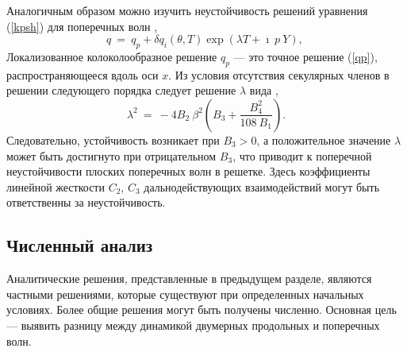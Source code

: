 Аналогичным образом можно изучить неустойчивость решений уравнения (\ref {kpsh}) для поперечных волн \cite{porkros},
\begin{equation}
	q~=~q_p+\delta q_i (\theta,T)\exp (\lambda T +\imath~p~ Y),~\label{stshear}
\end{equation}
Локализованное колоколообразное решение $q_p$ --- это точное решение (\ref {qp}), распространяющееся вдоль оси $ x $.
Из условия отсутствия секулярных членов в решении следующего порядка следует решение $ \lambda $ вида \cite {porkros},
\[
\lambda^2~=~-4 B_2~\beta^2\left(B_3 +\frac{B_4^2}{108~B_1}\right).
\]
Следовательно, устойчивость возникает при $ B_3> 0 $, а положительное значение $ \lambda $ может быть достигнуто при отрицательном $ B_3 $, что приводит к поперечной неустойчивости плоских поперечных волн в решетке. Здесь коэффициенты линейной жесткости $ C_2 $, $ C_3 $ дальнодействующих взаимодействий могут быть ответственны за неустойчивость.

\subsection{Численный анализ}
Аналитические решения, представленные в предыдущем разделе, являются частными решениями, которые существуют при определенных начальных условиях. Более общие решения могут быть получены численно. Основная цель --- выявить разницу между динамикой двумерных продольных и поперечных волн.

